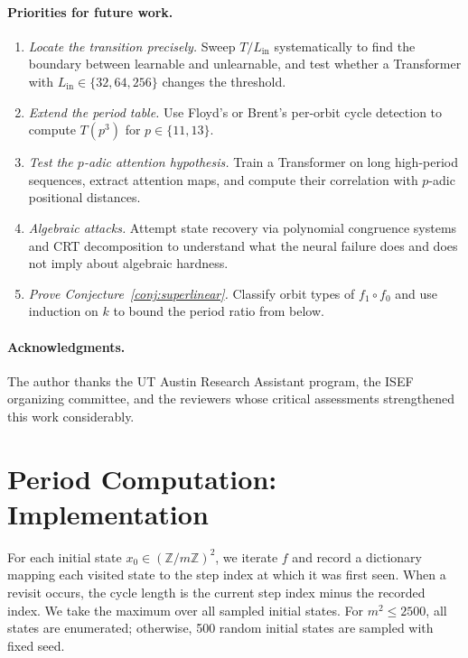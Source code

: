 \documentclass[11pt]{article}
\theoremstyle{plain}
\theoremstyle{definition}
\newcommand{\Z}{\mathbb{Z}}
\begin{document}
\paragraph{Priorities for future work.}
\begin{enumerate}[leftmargin=2em,itemsep=2pt]
  \item \textit{Locate the transition precisely.} Sweep $T/L_{\mathrm{in}}$ systematically to find the boundary between learnable and unlearnable, and test whether a Transformer with $L_{\mathrm{in}} \in \{32, 64, 256\}$ changes the threshold.
  \item \textit{Extend the period table.} Use Floyd's or Brent's per-orbit cycle detection to compute $T(p^3)$ for $p \in \{11, 13\}$.
  \item \textit{Test the $p$-adic attention hypothesis.} Train a Transformer on long high-period sequences, extract attention maps, and compute their correlation with $p$-adic positional distances.
  \item \textit{Algebraic attacks.} Attempt state recovery via polynomial congruence systems and CRT decomposition to understand what the neural failure does and does not imply about algebraic hardness.
  \item \textit{Prove Conjecture~\ref{conj:superlinear}.} Classify orbit types of $f_1 \circ f_0$ and use induction on $k$ to bound the period ratio from below.
\end{enumerate}

\paragraph{Acknowledgments.} The author thanks the UT Austin Research Assistant program, the ISEF organizing committee, and the reviewers whose critical assessments strengthened this work considerably.

\newpage
\appendix

\section{Period Computation: Implementation}
\label{app:period}

For each initial state $x_0 \in (\Z/m\Z)^2$, we iterate $f$ and record a dictionary mapping each visited state to the step index at which it was first seen. When a revisit occurs, the cycle length is the current step index minus the recorded index. We take the maximum over all sampled initial states. For $m^2 \leq 2500$, all states are enumerated; otherwise, 500 random initial states are sampled with fixed seed.
\end{document}

